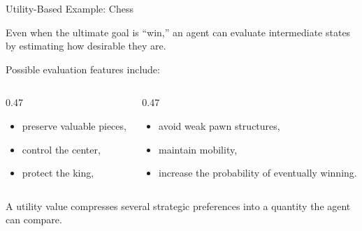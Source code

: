 \documentclass[aspectratio=169,10pt]{beamer}
\begin{document}
\begin{frame}{Utility-Based Example: Chess}
  \begin{keyidea}
    Even when the ultimate goal is ``win,'' an agent can evaluate intermediate states by estimating how desirable they are.
  \end{keyidea}
  \vspace{0.1in}
  Possible evaluation features include:
  \begin{columns}[T,onlytextwidth]
    \begin{column}{0.47\textwidth}
      \begin{itemize}
        \item preserve valuable pieces,
        \item control the center,
        \item protect the king,
      \end{itemize}
    \end{column}
    \begin{column}{0.47\textwidth}
      \begin{itemize}
        \item avoid weak pawn structures,
        \item maintain mobility,
        \item increase the probability of eventually winning.
      \end{itemize}
    \end{column}
  \end{columns}
  \vspace{0.1in}
  \begin{exampleblockcp}
    A utility value compresses several strategic preferences into a quantity the agent can compare.
  \end{exampleblockcp}
\end{frame}
\end{document}
